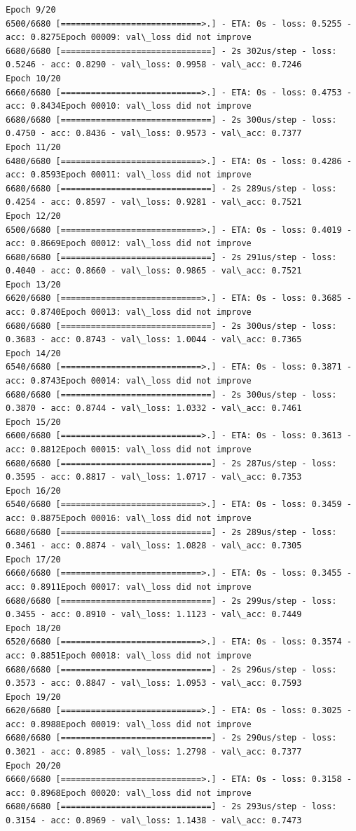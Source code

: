 \documentclass[11pt]{article}
\begin{document}
\begin{Verbatim}[commandchars=\\\{\}]
Epoch 9/20
6500/6680 [============================>.] - ETA: 0s - loss: 0.5255 - acc: 0.8275Epoch 00009: val\_loss did not improve
6680/6680 [==============================] - 2s 302us/step - loss: 0.5246 - acc: 0.8290 - val\_loss: 0.9958 - val\_acc: 0.7246
Epoch 10/20
6660/6680 [============================>.] - ETA: 0s - loss: 0.4753 - acc: 0.8434Epoch 00010: val\_loss did not improve
6680/6680 [==============================] - 2s 300us/step - loss: 0.4750 - acc: 0.8436 - val\_loss: 0.9573 - val\_acc: 0.7377
Epoch 11/20
6480/6680 [============================>.] - ETA: 0s - loss: 0.4286 - acc: 0.8593Epoch 00011: val\_loss did not improve
6680/6680 [==============================] - 2s 289us/step - loss: 0.4254 - acc: 0.8597 - val\_loss: 0.9281 - val\_acc: 0.7521
Epoch 12/20
6500/6680 [============================>.] - ETA: 0s - loss: 0.4019 - acc: 0.8669Epoch 00012: val\_loss did not improve
6680/6680 [==============================] - 2s 291us/step - loss: 0.4040 - acc: 0.8660 - val\_loss: 0.9865 - val\_acc: 0.7521
Epoch 13/20
6620/6680 [============================>.] - ETA: 0s - loss: 0.3685 - acc: 0.8740Epoch 00013: val\_loss did not improve
6680/6680 [==============================] - 2s 300us/step - loss: 0.3683 - acc: 0.8743 - val\_loss: 1.0044 - val\_acc: 0.7365
Epoch 14/20
6540/6680 [============================>.] - ETA: 0s - loss: 0.3871 - acc: 0.8743Epoch 00014: val\_loss did not improve
6680/6680 [==============================] - 2s 300us/step - loss: 0.3870 - acc: 0.8744 - val\_loss: 1.0332 - val\_acc: 0.7461
Epoch 15/20
6600/6680 [============================>.] - ETA: 0s - loss: 0.3613 - acc: 0.8812Epoch 00015: val\_loss did not improve
6680/6680 [==============================] - 2s 287us/step - loss: 0.3595 - acc: 0.8817 - val\_loss: 1.0717 - val\_acc: 0.7353
Epoch 16/20
6540/6680 [============================>.] - ETA: 0s - loss: 0.3459 - acc: 0.8875Epoch 00016: val\_loss did not improve
6680/6680 [==============================] - 2s 289us/step - loss: 0.3461 - acc: 0.8874 - val\_loss: 1.0828 - val\_acc: 0.7305
Epoch 17/20
6660/6680 [============================>.] - ETA: 0s - loss: 0.3455 - acc: 0.8911Epoch 00017: val\_loss did not improve
6680/6680 [==============================] - 2s 299us/step - loss: 0.3455 - acc: 0.8910 - val\_loss: 1.1123 - val\_acc: 0.7449
Epoch 18/20
6520/6680 [============================>.] - ETA: 0s - loss: 0.3574 - acc: 0.8851Epoch 00018: val\_loss did not improve
6680/6680 [==============================] - 2s 296us/step - loss: 0.3573 - acc: 0.8847 - val\_loss: 1.0953 - val\_acc: 0.7593
Epoch 19/20
6620/6680 [============================>.] - ETA: 0s - loss: 0.3025 - acc: 0.8988Epoch 00019: val\_loss did not improve
6680/6680 [==============================] - 2s 290us/step - loss: 0.3021 - acc: 0.8985 - val\_loss: 1.2798 - val\_acc: 0.7377
Epoch 20/20
6660/6680 [============================>.] - ETA: 0s - loss: 0.3158 - acc: 0.8968Epoch 00020: val\_loss did not improve
6680/6680 [==============================] - 2s 293us/step - loss: 0.3154 - acc: 0.8969 - val\_loss: 1.1438 - val\_acc: 0.7473

    \end{Verbatim}
\end{document}

